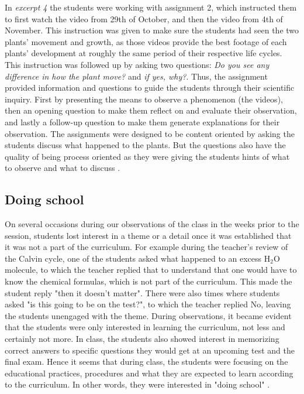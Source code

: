 In \emph{excerpt 4} the students were working with assignment 2, which instructed them to first watch the video from 29th of October, and then the video from 4th of November. This instruction was given to make sure the students had seen the two plants' movement and growth, as those videos provide the best footage of each plants' development at roughly the same period of their respective life cycles. This instruction was followed up by asking two questions: \emph{Do you see any difference in how the plant move?} and \emph{if yes, why?}. Thus, the assignment provided information and questions to guide the students through their scientific inquiry. First by presenting the means to observe a phenomenon (the videos), then an opening question to make them reflect on and evaluate their observation, and lastly a follow-up question to make them generate explanations for their observation. The assignments were designed to be content oriented by asking the students discuss what happened to the plants. But the questions also have the quality of being process oriented as they were giving the students hints of what to observe and what to discuss \citep{furberg2009socio}. 


\subsection{Doing school}

On several occasions during our observations of the class in the weeks prior to the session, students lost interest in a theme or a detail once it was established that it was not a part of the curriculum. For example during the teacher's review of the Calvin cycle, one of the students asked what happened to an excess $\text{H}_2\text{O}$ molecule, to which the teacher replied that to understand that one would have to know the chemical formulas, which is not part of the curriculum. This made the student reply "then it doesn't matter". There were also times where students asked "is this going to be on the test?", to which the teacher replied No, leaving the students unengaged with the theme. During observations, it became evident that the students were only interested in learning the curriculum, not less and certainly not more. In class, the students also showed interest in memorizing correct answers to specific questions they would get at an upcoming test and the final exam. Hence it seems that during class, the students were focusing on the educational practices, procedures and what they are expected to learn according to the curriculum. In other words, they were interested in "doing school" \citep{jimenez2000doing}.

